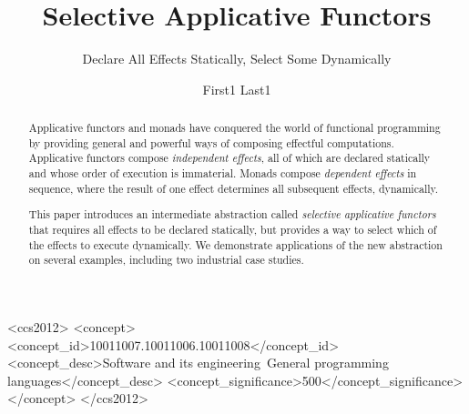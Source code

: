 \documentclass[acmsmall,review,anonymous]{acmart}\settopmatter{printfolios=true,printccs=false,printacmref=false}
\begin{document}
\title{Selective Applicative Functors}
\subtitle{Declare All Effects Statically, Select Some Dynamically}

\author{First1 Last1}

\begin{abstract}
Applicative functors and monads have conquered the world of functional
programming by providing general and powerful ways of composing effectful
computations. Applicative functors compose \emph{independent effects}, all of
which are declared statically and whose order of execution is immaterial.
Monads compose \emph{dependent effects} in sequence, where the result of one
effect determines all subsequent effects, dynamically.

This paper introduces an intermediate abstraction called \emph{selective
applicative functors} that requires all effects to be declared statically, but
provides a way to select which of the effects to execute dynamically. We
demonstrate applications of the new abstraction on several examples, including
two industrial case studies.
\end{abstract}

\begin{CCSXML}
<ccs2012>
<concept>
<concept_id>10011007.10011006.10011008</concept_id>
<concept_desc>Software and its engineering~General programming languages</concept_desc>
<concept_significance>500</concept_significance>
</concept>
</ccs2012>
\end{CCSXML}



\maketitle
\end{document}
